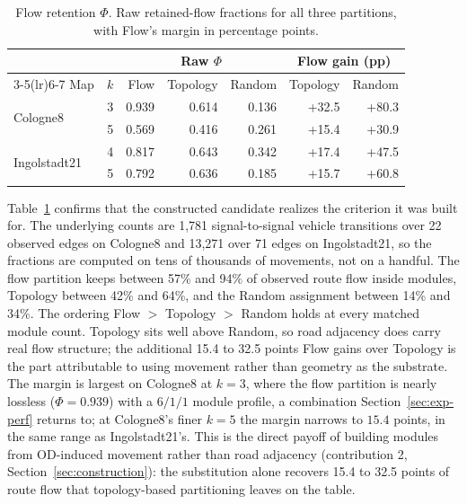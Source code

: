 \documentclass[journal]{IEEEtran}
\theoremstyle{definition}
\begin{document}
\begin{table}[t]
    \centering
    \caption{Flow retention $\Phi$. Raw retained-flow fractions for all three
        partitions, with Flow's margin in percentage points.}
    \label{tab:phi}
    \footnotesize
    \begin{tabular}{lrrrrrr}
        \toprule
                                      &     & \multicolumn{3}{c}{Raw $\Phi$} & \multicolumn{2}{c}{Flow gain (pp)}                              \\
        \cmidrule(lr){3-5}\cmidrule(lr){6-7}
        Map                           & $k$ & Flow                           & Topology                           & Random & Topology & Random \\
        \midrule
        \multirow{2}{*}{Cologne8}     & 3   & 0.939                          & 0.614                              & 0.136  & +32.5    & +80.3  \\
                                      & 5   & 0.569                          & 0.416                              & 0.261  & +15.4    & +30.9  \\\midrule
        \multirow{2}{*}{Ingolstadt21} & 4   & 0.817                          & 0.643                              & 0.342  & +17.4    & +47.5  \\
                                      & 5   & 0.792                          & 0.636                              & 0.185  & +15.7    & +60.8  \\
        \bottomrule
    \end{tabular}
\end{table}

Table~\ref{tab:phi} confirms that the constructed candidate realizes the criterion it was built for. The underlying counts are 1{,}781 signal-to-signal vehicle transitions over 22 observed edges on Cologne8 and 13{,}271 over 71 edges on Ingolstadt21, so the fractions are computed on tens of thousands of movements, not on a handful. The flow partition keeps between 57\% and 94\% of observed route flow inside modules, Topology between 42\% and 64\%, and the Random assignment between 14\% and 34\%. The ordering Flow $>$ Topology $>$ Random holds at every matched module count. Topology sits well above Random, so road adjacency does carry real flow structure; the additional 15.4 to 32.5 points Flow gains over Topology is the part attributable to using movement rather than geometry as the substrate. The margin is largest on Cologne8 at $k=3$, where the flow partition is nearly lossless ($\Phi=0.939$) with a $6/1/1$ module profile, a combination Section~\ref{sec:exp-perf} returns to; at Cologne8's finer $k=5$ the margin narrows to $15.4$ points, in the same range as Ingolstadt21's. This is the direct payoff of building modules from OD-induced movement rather than road adjacency (contribution 2, Section~\ref{sec:construction}): the substitution alone recovers 15.4 to 32.5 points of route flow that topology-based partitioning leaves on the table.
\end{document}
